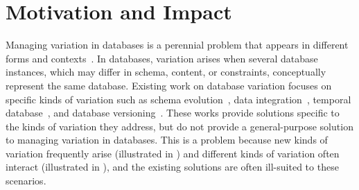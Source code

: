 \section{Motivation and Impact}
\label{sec:mot}


Managing variation in databases is a perennial problem that appears in
different forms and
contexts~\cite{curateVdata,ALW21vamos,ready17cidr,clams16sigmod,datahub15cidr}.
%
In databases, variation arises when several database instances, which may
differ in schema, content, or constraints, conceptually represent the same
database.
%
%
Existing work on database variation focuses on specific kinds of variation such
as schema evolution~\cite{SchEvolRA90McKenzie, schVersioning97Castro,
tempSchEvol91Ariav, tsql95Snodgrass, prima08Moon}, data
integration~\cite{dataIntegBook}, temporal database~\cite{tempDataMng, tempDBSurv, tempDBbook},
and database versioning~\cite{datasetVersioning,dbVersioning}. These works provide solutions
specific to the kinds of variation they address, but do not provide a
general-purpose solution to managing variation in databases.
%
This is a problem because new kinds of variation frequently arise (illustrated in ) and different
kinds of variation often interact (illustrated in ), and the existing solutions are often
ill-suited to these scenarios.




